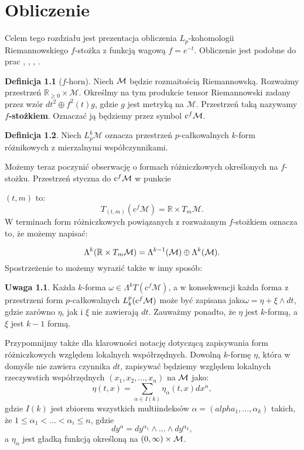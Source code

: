 \documentclass[licencjacka]{pracamgr}
\theoremstyle{definition}
\newtheorem{definition}{Definicja}[section]
\theoremstyle{definition}
\newtheorem{remark}{Uwaga}[section]
\theoremstyle{plain}
\theoremstyle{plain}
\def\cfm{\ensuremath\mathrm{c}^f\mathcal{M}}
\def\M{\ensuremath\mathcal{M}}
\begin{document}
\chapter{Obliczenie}

Celem tego rozdziału jest prezentacja obliczenia 
$L_p$-kohomologii Riemannowskiego $f$-stożka z funkcją wagową $f = e^{-t}$.
Obliczenie jest podobne do prac \cite{cheeger}, \cite{youssin}, \cite{kirwan},
\cite{weber}.

\begin{definition}[$f$-horn]
    Niech $\M$ będzie rozmaitością Riemannowską. Rozważmy przestrzeń
    $\mathbb{R}_{\geq 0} \times \mathcal{M}$. Określmy na tym produkcie tensor
    Riemannowski zadany przez wzór $dt^2 \oplus f^{2}(t)g $, gdzie $g$ jest
    metryką na $\mathcal{M}$.  Przestrzeń taką nazywamy \textbf{$f$-stożkiem}.
    Oznaczać ją będziemy przez symbol $\cfm$.
\end{definition}

\begin{definition}
  Niech $L_p^k \mathcal{M}$ oznacza przestrzeń $p$-całkowalnych 
  $k$-form różnikowych z mierzalnymi  współczynnikami.
\end{definition}



Możemy teraz poczynić obserwację o formach różniczkowych określonych na 
$f$-stożku. Przestrzeń styczna do $\cfm$ w punkcie 

$(t, m)$ to:
\[
    T_{(t, m)} (\mathrm{c}^f \mathcal{M}) = \mathbb{R} \times T_m \mathcal{M}.
\]
W terminach form różniczkowych powiązanych z rozważanym $f$-stożkiem oznacza to, 
że możemy napisać:

\[
\Lambda^k(\mathbb{R} \times T_m \M) = 
\Lambda^{k-1}(\M)  \oplus \Lambda^k(\M).
\]
Spostrzeżenie to możemy wyrazić także w inny sposób: 

\begin{remark}
Każda $k$-forma $\omega \in \Lambda^k T(\mathrm{c}^f \mathcal{M})$, 
a w konsekwencji każda forma z przestrzeni form $p$-całkowalnych  $L_k^p
(\cfm)$ może być zapisana jako$\omega = \eta + \xi \wedge dt$,
gdzie zarówno $\eta$, jak i  $\xi$ nie zawierają $dt$.  Zauważmy ponadto,
że $\eta$ jest $k$-formą, a $\xi$ jest $k-1$ formą. \\
\end{remark}

Przypomnijmy także dla klarowności notację dotyczącą zapisywania form różniczkowych
względem lokalnych współrzędnych. Dowolną $k$-formę $\eta$, która w domyśle nie zawiera
czynnika $dt$, zapisywać będziemy względem lokalnych rzeczywstich współrzędnych
$(x_1, x_2, ... , x_n)$ na $\M$ jako:
\[
    \eta(t, x) = \sum_{\alpha \in I(k)} \eta_\alpha (t, x) dx^\alpha,
\]
gdzie $I(k)$ jest zbiorem wszystkich multiindeksów $\alpha = (alpha_1, ...,
\alpha_k)$ takich, że $1 \leq \alpha_1 < ... < \alpha_i \leq n$, gdzie
\begin{equation}\label{notacja}
    dy^\alpha = dy^{\alpha_1} \wedge ... \wedge dy^{\alpha_k},
\end{equation}
a $\eta_\alpha$ jest gładką funkcją określoną na $(0, \infty) \times \M$. \\
\end{document}
